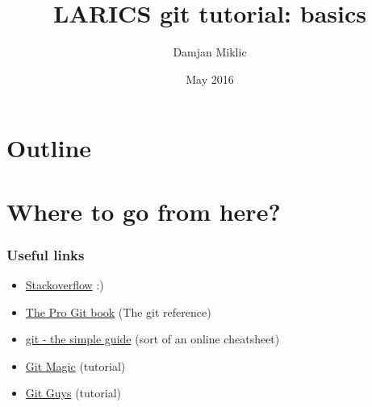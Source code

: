 \documentclass{beamer}%
\title[git basics]
{LARICS git tutorial: basics}
\author[Miklic]{Damjan Miklic}
\institute[LARICS]{LARICS Lab\\FER, University of Zagreb}
\date[]{May 2016}
\begin{document}

\begin{frame}
	\titlepage
\end{frame}


\section*{Outline}
\begin {frame}
	\tableofcontents
\end{frame}











\section{Where to go from here?}

\begin{frame}
	\frametitle{Useful links}
	
	\begin{itemize}
		\item \href{http://stackoverflow.com/questions/tagged/git}{Stackoverflow} :)
		\item \href{https://git-scm.com/book/en/v2}{The Pro Git book} (The git reference)
		\item \href{http://rogerdudler.github.io/git-guide/}{git - the simple guide} (sort of an online cheatsheet)
		\item \href{http://www-cs-students.stanford.edu/~blynn/gitmagic/}{Git Magic} (tutorial) 
		\item \href{http://www.gitguys.com/}{Git Guys} (tutorial)
	\end{itemize}
	
\end{frame}
\end{document}
